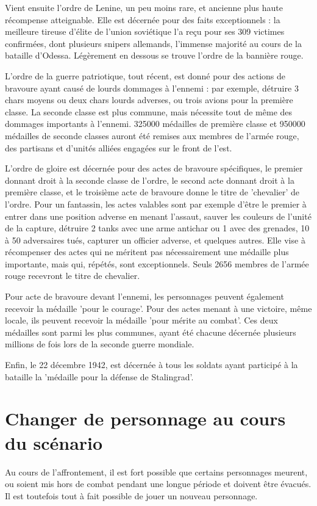 \documentclass{report}
\begin{document}
\begin{multicols}{2}
Vient ensuite l'ordre de Lenine, un peu moins rare, et ancienne plus haute récompense atteignable. Elle est décernée pour des faits exceptionnels : la meilleure tireuse d'élite de l'union soviétique l'a reçu pour ses 309 victimes confirmées, dont plusieurs snipers allemands, l'immense majorité au cours de la bataille d'Odessa. Légèrement en dessous se trouve l'ordre de la bannière rouge.

L'ordre de la guerre patriotique, tout récent, est donné pour des actions de bravoure ayant causé de lourds dommages à l'ennemi : par exemple, détruire 3 chars moyens ou deux chars lourds adverses, ou trois avions pour la première classe. La seconde classe est plus commune, mais nécessite tout de même des dommages importants à l'ennemi. 325000 médailles de première classe et 950000 médailles de seconde classes auront été remises aux membres de l'armée rouge, des partisans et d'unités alliées engagées sur le front de l'est.

L'ordre de gloire est décernée pour des actes de bravoure spécifiques, le premier donnant droit à la seconde classe de l'ordre, le second acte donnant droit à la première classe, et le troisième acte de bravoure donne le titre de 'chevalier' de l'ordre. Pour un fantassin, les actes valables sont par exemple d'être le premier à entrer dans une position adverse en menant l'assaut, sauver les couleurs de l'unité de la capture, détruire 2 tanks avec une arme antichar ou 1 avec des grenades, 10 à 50 adversaires tués, capturer un officier adverse, et quelques autres. Elle vise à récompenser des actes qui ne méritent pas nécessairement une médaille plus importante, mais qui, répétés, sont exceptionnels. Seuls 2656 membres de l'armée rouge recevront le titre de chevalier.

Pour acte de bravoure devant l'ennemi, les personnages peuvent également recevoir la médaille 'pour le courage'. Pour des actes menant à une victoire, même locale, ils peuvent recevoir la médaille 'pour mérite au combat'. Ces deux médailles sont parmi les plus communes, ayant été chacune décernée plusieurs millions de fois lors de la seconde guerre mondiale.

Enfin, le 22 décembre 1942, est décernée à tous les soldats ayant participé à la bataille la 'médaille pour la défense de Stalingrad'.
\section{Changer de personnage au cours du scénario}
Au cours de l'affrontement, il est fort possible que certains personnages meurent, ou soient mis hors de combat pendant une longue période et doivent être évacués. Il est toutefois tout à fait possible de jouer un nouveau personnage.


\end{multicols}
\end{document}
